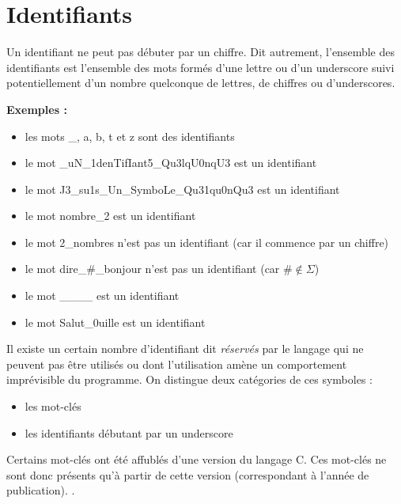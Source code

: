 \documentclass[../../../main.tex]{subfiles}
\begin{document}
\section{Identifiants}
 
Un identifiant ne peut pas débuter par un chiffre.
Dit autrement, l'ensemble des identifiants est l'ensemble des mots formés d'une lettre ou d'un underscore suivi potentiellement d'un nombre quelconque de lettres, de chiffres ou d'underscores.
 
\textbf{Exemples :}
\begin{itemize}
	\item les mots \textsf{\_}, \textsf{a}, \textsf{b}, \textsf{t} et \textsf{z} sont des identifiants
	\item le mot \textsf{\_uN\_1denTifIant5\_Qu3lqU0nqU3} est un identifiant
	\item le mot \textsf{J3\_su1s\_Un\_SymboLe\_Qu31qu0nQu3} est un identifiant
	\item le mot \textsf{nombre\_2} est un identifiant
	\item le mot \textsf{2\_nombres} n'est pas un identifiant (car il commence par un chiffre)
	\item le mot \textsf{dire\_\#\_bonjour} n'est pas un identifiant (car $\#\notin{\Sigma}$)
	\item le mot \textsf{\_\_\_\_} est un identifiant
	\item le mot \textsf{Salut\_0uille} est un identifiant
\end{itemize}
Il existe un certain nombre d'identifiant dit \textit{réservés} par le langage qui ne peuvent pas être utilisés ou dont l'utilisation amène un comportement imprévisible du programme. On distingue deux catégories de ces symboles :
\begin{itemize}
	\item les mot-clés
	\item les identifiants débutant par un underscore
\end{itemize}
Certains mot-clés ont été affublés d'une version du langage C. Ces mot-clés ne sont donc présents qu'à partir de cette version (correspondant à l'année de publication). .
 
\end{document}
